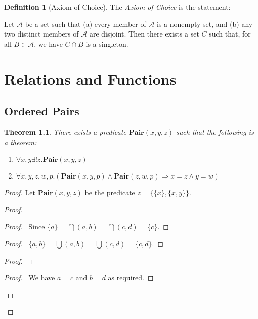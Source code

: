 \documentclass{report}
\let\qed\relax
\newtheorem{theorem}[axiom]{Theorem}
\theoremstyle{definition}
\newtheorem{definition}[axiom]{Definition}
\begin{document}
    \begin{definition}[Axiom of Choice]
        The \emph{Axiom of Choice} is the statement:

        Let $\mathcal{A}$ be a set such that (a) every member of $\mathcal{A}$ is a nonempty set,
        and (b) any two distinct members of $\mathcal{A}$ are disjoint. Then there exists a set $C$
        such that, for all $B \in \mathcal{A}$, we have $C \cap B$ is a singleton.
    \end{definition}

    \chapter{Relations and Functions}

    \section{Ordered Pairs}

    \begin{theorem}
        There exists a predicate $\mathbf{Pair}(x,y,z)$ such that the following is a theorem:
        \begin{enumerate}
            \item $\forall x,y \exists ! z. \mathbf{Pair}(x,y,z)$
            \item $\forall x,y,z,w,p. (\mathbf{Pair}(x,y,p) \wedge \mathbf{Pair}(z,w,p) \Rightarrow x = z \wedge y = w)$
        \end{enumerate}
    \end{theorem}

    \begin{proof}
        Let $\mathbf{Pair}(x,y,z)$ be the predicate $z = \{ \{ x \}, \{ x , y \} \}$.
        \pf
        \begin{proof}
            \begin{proof}
                \pf\ Since $\{a\} = \bigcap (a,b) = \bigcap (c,d) = \{c\}$.
            \end{proof}
            \begin{proof}
                \pf\ $\{a,b\} = \bigcup (a,b) = \bigcup (c,d) = \{c,d\}$.
            \end{proof}
            \begin{proof}
            \end{proof}
            \begin{proof}
                \pf\ We have $a = c$ and $b = d$ as required.
            \end{proof}
        \end{proof}
        \qed
    \end{proof}
\end{document}
